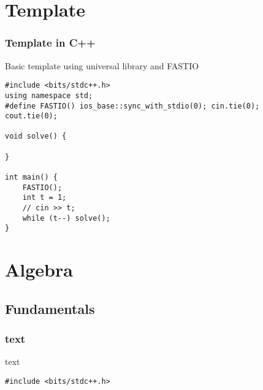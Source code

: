 \section{Template}
\subsubsection{Template in C++ }
Basic template using universal library and FASTIO

\begin{lstlisting}
#include <bits/stdc++.h>
using namespace std;
#define FASTIO() ios_base::sync_with_stdio(0); cin.tie(0); cout.tie(0);

void solve() {
    
}
 
int main() {
    FASTIO();
    int t = 1;
    // cin >> t;
    while (t--) solve();
}   
\end{lstlisting}

\section{Algebra}
\subsection{Fundamentals}
\subsubsection{text }
text

\begin{lstlisting}
#include <bits/stdc++.h>
\end{lstlisting}


